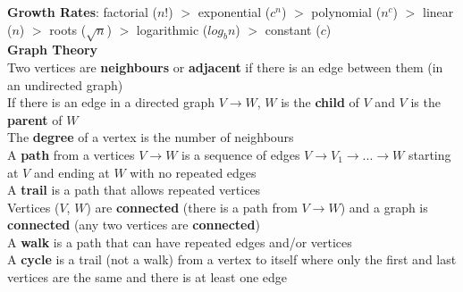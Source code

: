 \documentclass{article}
\begin{document}
\textbf{Growth Rates}: factorial ($n!$) $>$ exponential ($c^n$) $>$ polynomial ($n^c$) $>$ linear ($n$) $>$ roots ($\sqrt{n}$) $>$ logarithmic ($log_bn$) $>$ constant ($c$) \\
\textbf{Graph Theory} \\
\indent{}Two vertices are \textbf{neighbours} or \textbf{adjacent} if there is an edge between them (in an undirected graph) \\
\indent{}If there is an edge in a directed graph $V \rightarrow W$, $W$ is the \textbf{child} of $V$ and $V$ is the \textbf{parent} of $W$ \\
\indent{}The \textbf{degree} of a vertex is the number of neighbours \\
\indent{}A \textbf{path} from a vertices $V \rightarrow W$ is a sequence of edges $V \rightarrow V_1 \rightarrow ... \rightarrow W$ starting at $V$ and ending at $W$ with no repeated edges \\
\indent{}A \textbf{trail} is a path that allows repeated vertices \\
\indent{}Vertices ($V$, $W$) are \textbf{connected} (there is a path from $V \rightarrow W$) and a graph is \textbf{connected} (any two vertices are \textbf{connected}) \\
\indent{}A \textbf{walk} is a path that can have repeated edges and/or vertices \\
\indent{}A \textbf{cycle} is a trail (not a walk) from a vertex to itself where only the first and last vertices are the same and there is at least one edge
\end{document}
